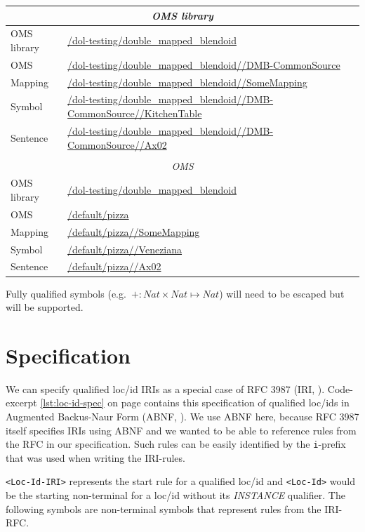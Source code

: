 \documentclass[10pt,fleqn,%
\ifpretendfinal
final%
\else
draft%
\fi,
]{scrreprt}
\begin{document}
\begin{tabularx}{\textwidth}{p{}p{}}
  \multicolumn{2}{c}{\emph{OMS library}} \\
  \hline
  OMS library & \url{/dol-testing/double_mapped_blendoid}\\
  OMS & \url{/dol-testing/double_mapped_blendoid//DMB-CommonSource}\\
  Mapping & \url{/dol-testing/double_mapped_blendoid//SomeMapping}\\
  Symbol & \url{/dol-testing/double_mapped_blendoid//DMB-CommonSource//KitchenTable}\\
  Sentence & \url{/dol-testing/double_mapped_blendoid//DMB-CommonSource//Ax02}\\
  & \\
  \multicolumn{2}{c}{\emph{OMS}} \\
  \hline
  OMS library & \url{/dol-testing/double_mapped_blendoid}\\
  OMS & \url{/default/pizza}\\
  Mapping & \url{/default/pizza//SomeMapping}\\
  Symbol & \url{/default/pizza//Veneziana}\\
  Sentence & \url{/default/pizza//Ax02}\\
\end{tabularx}

Fully qualified symbols (e.g.\ $+:Nat \times Nat\mapsto Nat$) will need to be escaped
but will be supported.

\section{Specification}

We can specify qualified loc/id IRIs as a special case of RFC 3987 (IRI,
\cite{rfc3987}). Code-excerpt \ref{lst:loc-id-spec} on page
\pageref{lst:loc-id-spec} contains this specification of qualified loc/ids in
Augmented Backus-Naur Form (ABNF, \cite{rfc5234}). We use ABNF here, because
RFC 3987 itself specifies IRIs using ABNF and we wanted to be able to reference
rules from the RFC in our specification. Such rules can be easily identified by
the \texttt{i}-prefix that was used when writing the IRI-rules.

\texttt{<Loc-Id-IRI>} represents the start rule for a qualified loc/id and
\texttt{<Loc-Id>} would be the starting non-terminal for a loc/id without its
\emph{INSTANCE} qualifier. The following symbols are non-terminal symbols that
represent rules from the IRI-RFC.
\end{document}
